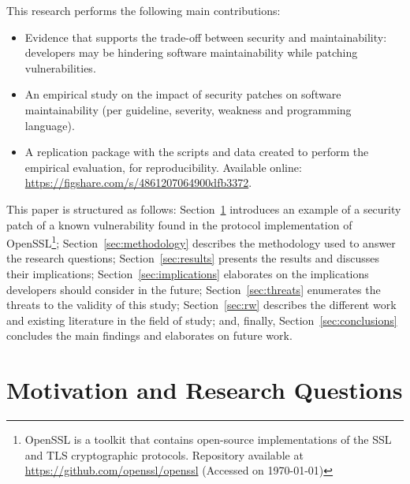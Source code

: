\documentclass[smallextended]{svjour3}       %
\begin{document}
This research performs the following main contributions:
%
\begin{itemize}
	\vspace{-0.3em}
  \item Evidence that supports the trade-off between security and 
  maintainability: developers may be hindering software 
  maintainability while patching vulnerabilities.
	\item An empirical study on the impact of security patches on 
	software maintainability (per guideline, severity, weakness and 
	programming language).
	\item A replication package with the scripts and data created to 
	perform the empirical evaluation, for reproducibility. Available 
	online: \url{https://figshare.com/s/4861207064900dfb3372}.
\end{itemize}
%
This paper is structured as follows: Section~\ref{sec:motivation} 
introduces an example of a security patch of a known vulnerability 
found in the protocol implementation of 
OpenSSL\footnote{\label{openssl}OpenSSL is a toolkit that
contains open-source implementations of the SSL and TLS cryptographic
protocols. Repository available at 
\url{https://github.com/openssl/openssl} (Accessed on \today{})}; 
Section~\ref{sec:methodology} describes the methodology used to 
answer the research questions; Section~\ref{sec:results} presents 
the results and discusses their implications; 
Section~\ref{sec:implications} elaborates on the implications
developers should consider in the future; Section~\ref{sec:threats} 
enumerates the threats to the validity of this study; 
Section~\ref{sec:rw} describes the different work and existing
literature in the field of study; and, finally, 
Section~\ref{sec:conclusions} concludes the main findings and 
elaborates on future work.

\section{Motivation and Research Questions}\label{sec:motivation}
\end{document}
